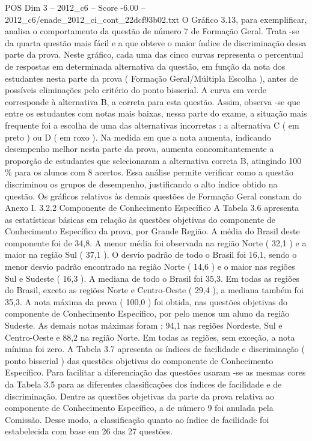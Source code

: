 \begin{textsample}{POS Dim 3 – 2012\_c6 – Score -6.00 – 2012\_c6/enade\_2012\_ci\_cont\_22dcf93b02.txt}
O Gráfico 3.13, para exemplificar, analisa o comportamento da questão de número 7 de Formação Geral.
Trata -se da quarta questão mais fácil e a que obteve o maior índice de discriminação dessa parte da prova.
Neste gráfico, cada uma das cinco curvas representa o percentual de respostas em determinada alternativa da questão, em função da nota dos estudantes nesta parte da prova ( Formação Geral/Múltipla Escolha ), antes de possíveis eliminações pelo critério do ponto bisserial.
A curva em verde corresponde à alternativa B, a correta para esta questão.
Assim, observa -se que entre os estudantes com notas mais baixas, nessa parte do exame, a situação mais frequente foi a escolha de uma das alternativas incorretas : a alternativa C ( em preto ) ou D ( em roxo ).
Na medida em que a nota aumenta, indicando desempenho melhor nesta parte da prova, aumenta concomitantemente a proporção de estudantes que selecionaram a alternativa correta B, atingindo 100 \% para os alunos com 8 acertos.
Essa análise permite verificar como a questão discriminou os grupos de desempenho, justificando o alto índice obtido na questão.
Os gráficos relativos às demais questões de Formação Geral constam do Anexo I. 3.2.2 Componente de Conhecimento Específico A Tabela 3.6 apresenta as estatísticas básicas em relação às questões objetivas do componente de Conhecimento Específico da prova, por Grande Região.
A média do Brasil deste componente foi de 34,8.
A menor média foi observada na região Norte ( 32,1 ) e a maior na região Sul ( 37,1 ).
O desvio padrão de todo o Brasil foi 16,1, sendo o menor desvio padrão encontrado na região Norte ( 14,6 ) e o maior nas regiões Sul e Sudeste ( 16,3 ).
A mediana de todo o Brasil foi 35,3.
Em todas as regiões do Brasil, exceto as regiões Norte e Centro-Oeste ( 29,4 ), a mediana também foi 35,3.
A nota máxima da prova ( 100,0 ) foi obtida, nas questões objetivas do componente de Conhecimento Específico, por pelo menos um aluno da região Sudeste.
As demais notas máximas foram : 94,1 nas regiões Nordeste, Sul e Centro-Oeste e 88,2 na região Norte.
Em todas as regiões, sem exceção, a nota mínima foi zero.
A Tabela 3.7 apresenta os índices de facilidade e discriminação ( ponto bisserial ) das questões objetivas do componente de Conhecimento Específico.
Para facilitar a diferenciação das questões usaram -se as mesmas cores da Tabela 3.5 para as diferentes classificações dos índices de facilidade e de discriminação.
Dentre as questões objetivas da parte da prova relativa ao componente de Conhecimento Específico, a de número 9 foi anulada pela Comissão.
Desse modo, a classificação quanto ao índice de facilidade foi estabelecida com base em 26 das 27 questões.

\end{textsample}
